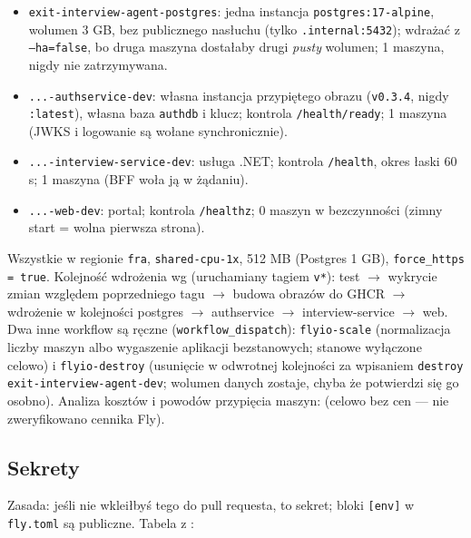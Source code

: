 {\begin{itemize}[leftmargin=*,itemsep=1pt]
  \item \texttt{exit-interview-agent-postgres}: jedna instancja \texttt{postgres:17-alpine}, wolumen 3 GB, bez publicznego nasłuchu (tylko \texttt{.internal:5432}); wdrażać z \texttt{--ha=false}, bo druga maszyna dostałaby drugi \emph{pusty} wolumen; 1 maszyna, nigdy nie zatrzymywana.
  \item \texttt{...-authservice-dev}: własna instancja przypiętego obrazu (\texttt{v0.3.4}, nigdy \texttt{:latest}), własna baza \texttt{authdb} i klucz; kontrola \texttt{/health/ready}; 1 maszyna (JWKS i logowanie są wołane synchronicznie).
  \item \texttt{...-interview-service-dev}: usługa .NET; kontrola \texttt{/health}, okres łaski 60 s; 1 maszyna (BFF woła ją w żądaniu).
  \item \texttt{...-web-dev}: portal; kontrola \texttt{/healthz}; 0 maszyn w bezczynności (zimny start = wolna pierwsza strona).
\end{itemize}

Wszystkie w regionie \texttt{fra}, \texttt{shared-cpu-1x}, 512 MB (Postgres
1 GB), \texttt{force\_\allowbreak{}https = true}. Kolejność wdrożenia wg
 (uruchamiany tagiem \texttt{v*}):
test $\rightarrow$ wykrycie zmian względem poprzedniego tagu $\rightarrow$
budowa obrazów do GHCR $\rightarrow$ wdrożenie w kolejności postgres $\rightarrow$
authservice $\rightarrow$ interview-service $\rightarrow$ web. Dwa inne workflow są
ręczne (\texttt{workflow\_\allowbreak{}dispatch}): \texttt{flyio-scale} (normalizacja liczby
maszyn albo wygaszenie aplikacji bezstanowych; stanowe wyłączone celowo) i
\texttt{flyio-destroy} (usunięcie w odwrotnej kolejności za wpisaniem
\texttt{destroy exit-\allowbreak{}interview-\allowbreak{}agent-\allowbreak{}dev}; wolumen danych zostaje, chyba że
potwierdzi się go osobno). Analiza kosztów i powodów przypięcia maszyn:
 (celowo bez cen --- nie zweryfikowano
cennika Fly).

\subsection{Sekrety}

Zasada: jeśli nie wkleiłbyś tego do pull requesta, to sekret; bloki \texttt{[env]}
w \texttt{fly.toml} są publiczne. Tabela z :

}
